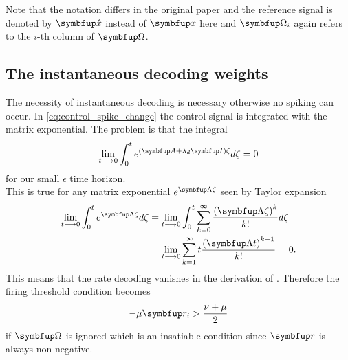 Note that the notation differs in the original paper and the reference signal is denoted by $\bmu{\hat{x}}$ instead of $\bmu{x}$ here and $\bmu{\Omega}_i$ again refers to the $i$-th column of $\bmu{\Omega}$.
\subsection{The instantaneous decoding weights}
The necessity of instantaneous decoding is necessary otherwise no spiking can occur. In \cref{eq:control_spike_change} the control signal is integrated with the matrix exponential. The problem is that the integral
\begin{equation}
	\lim_{t\longrightarrow 0 } \int_0^t e^{(\bmu{A}+\lambda_d\bmu{I})\zeta}d\zeta = 0
\end{equation}
for our small $\epsilon$ time horizon.\\
This is true for any matrix exponential $e^{\bmu{\Lambda}\zeta}$ seen by Taylor expansion
\begin{equation}
	\begin{aligned}
	\lim_{t\longrightarrow 0 }\int_0^t e^{\bmu{\Lambda}\zeta}d\zeta &= \lim_{t\longrightarrow 0 } \int_0^t \sum_{k=0}^\infty \frac{\left(\bmu{\Lambda}\zeta\right)^k}{k!} d\zeta\\
	&=\lim_{t\longrightarrow 0 }\sum_{k=1}^\infty t\frac{\left(\bmu{\Lambda}t\right)^{k-1}}{k!} = 0.
	\end{aligned}
\end{equation}
This means that the rate decoding vanishes in the derivation of . Therefore the firing threshold condition becomes
\begin{equation}
	-\mu \bmu{r}_i > \frac{\nu  + \mu}{2}
\end{equation}
if $\bmu{\Omega}$ is ignored which is an insatiable condition since $\bmu{r}$ is always non-negative.

